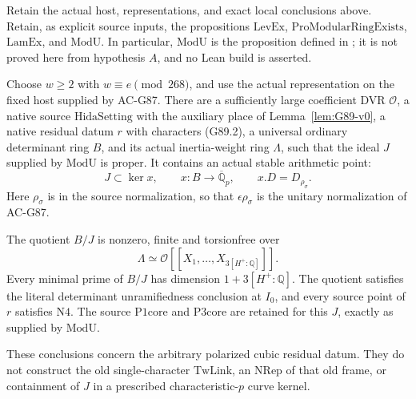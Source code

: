 \begin{theorem}
\label{thm:G89-support}
Retain the actual host, representations, and exact local conclusions
above.  Retain, as explicit source inputs, the propositions
\(\mathrm{LevEx}\), \(\mathrm{ProModularRingExists}\),
\(\mathrm{LamEx}\), and \(\mathrm{ModU}\).
In particular, \(\mathrm{ModU}\) is the proposition defined in
; it is not proved here
from hypothesis \(A\), and no Lean build is asserted.

Choose \(w\geq2\) with \(w\equiv e\pmod{268}\), and use the
actual representation on the fixed host supplied by AC-G87.
There are a sufficiently large coefficient DVR \(\mathcal O\),
a native source \(\mathrm{HidaSetting}\) with the auxiliary
place of Lemma~\ref{lem:G89-v0}, a native residual datum \(r\)
with characters (G89.2), a universal ordinary determinant ring
\(B\), and its actual inertia-weight ring \(\Lambda\), such that
the ideal \(J\) supplied by \(\mathrm{ModU}\) is proper.
It contains an actual stable arithmetic point:
\[
 J\subset\ker x,\qquad
 x:B\longrightarrow\overline{\mathbb Q}_p,\qquad
 x.D=D_{\rho_\sigma}.                              \tag{G89.11}
\]
Here \(\rho_\sigma\) is in the source normalization, so that
\(\epsilon\rho_\sigma\) is the unitary normalization of AC-G87.

The quotient \(B/J\) is nonzero, finite and torsionfree over
\[
 \Lambda\simeq
       \mathcal O[[X_1,\ldots,X_{3[H^+:\mathbb Q]}]].       \tag{G89.12}
\]
Every minimal prime of \(B/J\) has dimension
\(1+3[H^+:\mathbb Q]\).
The quotient satisfies the literal determinant
unramifiedness conclusion at \(I_0\), and every source point
of \(r\) satisfies \(\mathrm{N4}\).
The source \(\mathrm{P1core}\) and \(\mathrm{P3core}\)
are retained for this \(J\), exactly as supplied by
\(\mathrm{ModU}\).

These conclusions concern the arbitrary polarized cubic residual
datum.  They do not construct the old single-character
\(\mathrm{TwLink}\), an \(\mathrm{NRep}\) of that old frame,
or containment of \(J\) in a prescribed characteristic-\(p\)
curve kernel.
\end{theorem}

